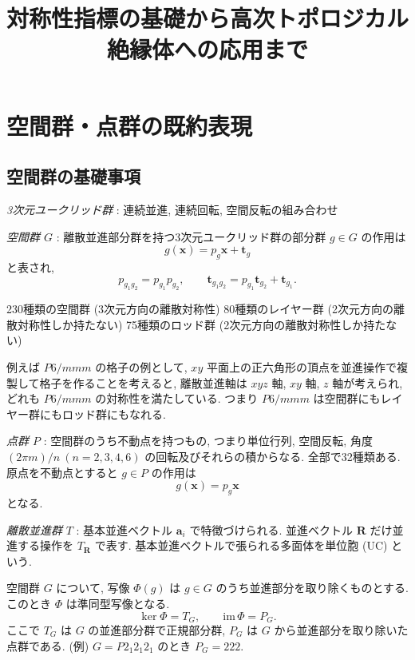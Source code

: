 \documentclass[12pt]{article}
\title{対称性指標の基礎から高次トポロジカル絶縁体への応用まで}
\author{}
\date{}
\newcommand{\vect}[1]{\boldsymbol{#1}}
\begin{document}
\maketitle

\section{空間群・点群の既約表現}

\subsection{空間群の基礎事項}

\emph{3次元ユークリッド群} : 連続並進, 連続回転, 空間反転の組み合わせ

\emph{空間群 $G$} : 離散並進部分群を持つ3次元ユークリッド群の部分群
$g \in G$ の作用は
\begin{equation}
 g(\vect{x}) = p_g \vect{x} + \vect{t}_g
\end{equation}
と表され,
\begin{equation}
 p_{g_1 g_2} = p_{g_1} p_{g_2}, \qquad
 \vect{t}_{g_1 g_2} = p_{g_1} \vect{t}_{g_2} + \vect{t}_{g_1}.
\end{equation}

230種類の空間群 (3次元方向の離散対称性)
80種類のレイヤー群 (2次元方向の離散対称性しか持たない)
75種類のロッド群 (2次元方向の離散対称性しか持たない)

例えば $P6/mmm$ の格子の例として, $xy$ 平面上の正六角形の頂点を並進操作で複製して格子を作ることを考えると, 離散並進軸は $xyz$ 軸, $xy$ 軸, $z$ 軸が考えられ, どれも $P6/mmm$ の対称性を満たしている. つまり $P6/mmm$ は空間群にもレイヤー群にもロッド群にもなれる.

\emph{点群 $P$} : 空間群のうち不動点を持つもの, つまり単位行列, 空間反転, 角度 $(2\pi m)/n\ (n=2,3,4,6)$ の回転及びそれらの積からなる. 全部で32種類ある. 原点を不動点とすると $g \in P$ の作用は
\begin{equation}
 g(\vect{x}) = p_g \vect{x}
\end{equation}
となる.

\emph{離散並進群} $T$ : 基本並進ベクトル $\vect{a}_i$ で特徴づけられる. 並進ベクトル $\vect{R}$ だけ並進する操作を $T_{\vect{R}}$ で表す. 基本並進ベクトルで張られる多面体を単位胞 (UC) という.

空間群 $G$ について, 写像 $\Phi(g)$ は $g \in G$ のうち並進部分を取り除くものとする. このとき $\Phi$ は準同型写像となる.
\begin{equation}
 \ker\Phi = T_G, \qquad \mathrm{im}\,\Phi = P_G.
\end{equation}
ここで $T_G$ は $G$ の並進部分群で正規部分群, $P_G$ は $G$ から並進部分を取り除いた点群である. (例) $G = P2_1 2_1 2_1$ のとき $P_G = 222$.
\end{document}
